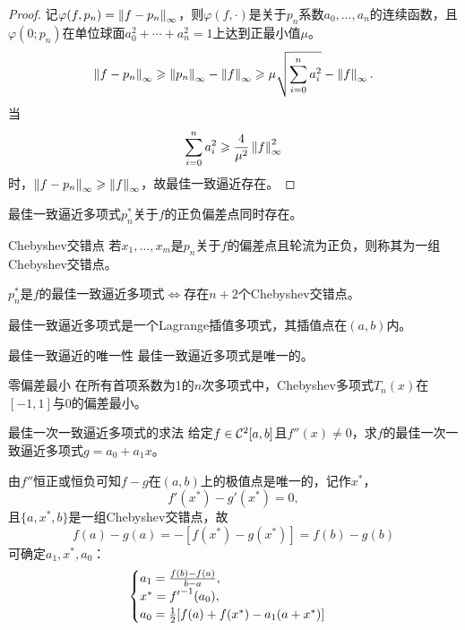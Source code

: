 \begin{proof}
    记$\varphi(f,p_n)=\left\lVert f-p_n\right\rVert_\infty$，则$\varphi(f,\cdot)$是关于$p_n$系数$a_0,\ldots,a_n$的连续函数，且$\varphi(0;p_n)$在单位球面$a_0^2+\cdots+a_n^2=1$上达到正最小值$\mu$。
    \[
        \left\lVert f-p_n\right\rVert_\infty\geqslant\left\lVert p_n\right\rVert_\infty-\left\lVert f\right\rVert_\infty\geqslant\mu\sqrt{\sum_{i=0}^na_i^2}-\left\lVert f\right\rVert_\infty.
    \]
    当
    \[
        \sum_{i=0}^na_i^2\geqslant\frac4{\mu^2}\left\lVert f\right\rVert_\infty^2
    \]
    时，$\left\lVert f-p_n\right\rVert_\infty\geqslant\left\lVert f\right\rVert_\infty$，故最佳一致逼近存在。
\end{proof}

\begin{lemma}
    最佳一致逼近多项式$p_n^*$关于$f$的正负偏差点同时存在。
\end{lemma}

\begin{definition}
    {Chebyshev交错点}{}
    若$x_1,\ldots,x_m$是$p_n$关于$f$的偏差点且轮流为正负，则称其为一组Chebyshev交错点。
\end{definition}

\begin{theorem}
    {}{}
    $p_n^*$是$f$的最佳一致逼近多项式$\iff$存在$n+2$个Chebyshev交错点。
\end{theorem}

\begin{corollary}
    最佳一致逼近多项式是一个Lagrange插值多项式，其插值点在$(a,b)$内。
\end{corollary}

\begin{theorem}
    {最佳一致逼近的唯一性}{}
    最佳一致逼近多项式是唯一的。
\end{theorem}

\begin{theorem}
    {零偏差最小}{}
    在所有首项系数为1的$n$次多项式中，Chebyshev多项式$T_n(x)$在$[-1,1]$与0的偏差最小。
\end{theorem}

\begin{example}
    {最佳一次一致逼近多项式的求法}{}
    给定$f\in\mathcal C^2[a,b]$且$f''(x)\neq 0$，求$f$的最佳一次一致逼近多项式$g=a_0+a_1x$。

    由$f''$恒正或恒负可知$f-g$在$(a,b)$上的极值点是唯一的，记作$x^*$，
    \[
        f'(x^*)-g'(x^*)=0,
    \]
    且$\{a,x^*,b\}$是一组Chebyshev交错点，故
    \[
        f(a)-g(a)=-[f(x^*)-g(x^*)]=f(b)-g(b)
    \]
    可确定$a_1,x^*,a_0$：
    \[
        \begin{cases}
            a_1=\frac{f(b)-f(a)}{b-a},\\
            x^*={f'}^{-1}(a_0),\\
            a_0=\frac12[f(a)+f(x^*)-a_1(a+x^*)]
        \end{cases}
    \]
\end{example}
